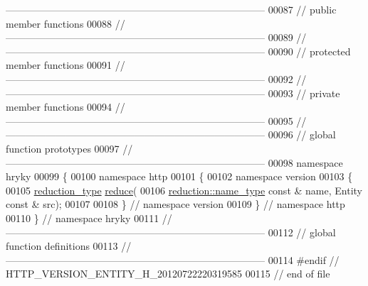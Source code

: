 \begin{DoxyCode}
{      ------------------------------------------------------------------------------}
00087 \textcolor{comment}{// public member functions}
00088 \textcolor{comment}{//
      ------------------------------------------------------------------------------}
00089 \textcolor{comment}{//
      ------------------------------------------------------------------------------}
00090 \textcolor{comment}{// protected member functions}
00091 \textcolor{comment}{//
      ------------------------------------------------------------------------------}
00092 \textcolor{comment}{//
      ------------------------------------------------------------------------------}
00093 \textcolor{comment}{// private member functions}
00094 \textcolor{comment}{//
      ------------------------------------------------------------------------------}
00095 \textcolor{comment}{//
      ------------------------------------------------------------------------------}
00096 \textcolor{comment}{// global function prototypes}
00097 \textcolor{comment}{//
      ------------------------------------------------------------------------------}
00098 \textcolor{keyword}{namespace }hryky
00099 \{
00100 \textcolor{keyword}{namespace }http
00101 \{
00102 \textcolor{keyword}{namespace }version
00103 \{
00105     \hyperlink{namespacehryky_a343a9a4c36a586be5c2693156200eadc}{reduction_type} \hyperlink{namespacehryky_1_1http_a08fc36a78a8e2908140fcd102829a566}{reduce}(
00106         \hyperlink{namespacehryky_1_1reduction_ac686c30a4c8d196bbd0f05629a6b921f}{reduction::name_type} \textcolor{keyword}{const} & name, Entity \textcolor{keyword}{const} & src);
00107 
00108 \} \textcolor{comment}{// namespace version}
00109 \} \textcolor{comment}{// namespace http}
00110 \} \textcolor{comment}{// namespace hryky}
00111 \textcolor{comment}{//
      ------------------------------------------------------------------------------}
00112 \textcolor{comment}{// global function definitions}
00113 \textcolor{comment}{//
      ------------------------------------------------------------------------------}
00114 \textcolor{preprocessor}{#endif // HTTP\_VERSION\_ENTITY\_H\_20120722220319585}
00115 \textcolor{preprocessor}{}\textcolor{comment}{// end of file}
\end{DoxyCode}
